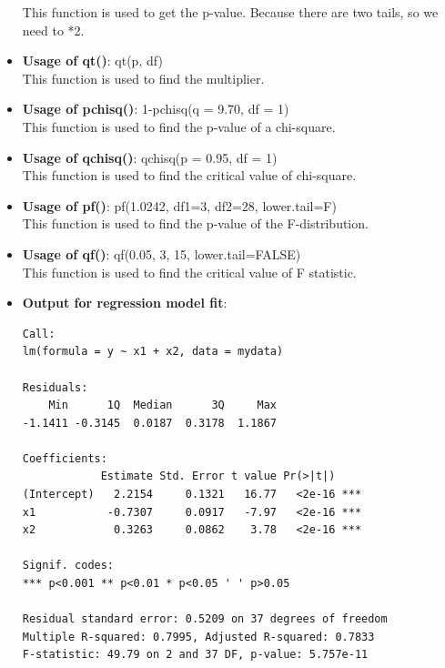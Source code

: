 \documentclass[12pt]{book}
\begin{document}
\begin{itemize}
This function is used to get the p-value. Because there are two tails, so we need to *2.

\item \textbf{Usage of qt()}: qt(p, df) \\
This function is used to find the multiplier.

\item \textbf{Usage of pchisq()}: 1-pchisq(q = 9.70, df = 1) \\
This function is used to find the p-value of a chi-square.

\item \textbf{Usage of qchisq()}: qchisq(p = 0.95, df = 1) \\
This function is used to find the critical value of chi-square.

\item \textbf{Usage of pf()}: pf(1.0242, df1=3, df2=28, lower.tail=F) \\
This function is used to find the p-value of the F-distribution.

\item \textbf{Usage of qf()}: qf(0.05, 3, 15, lower.tail=FALSE) \\
This function is used to find the critical value of F statistic.

\item \textbf{Output for regression model fit}:

\begin{mdframed}[backgroundcolor=gray!15, linecolor=black]
\begin{verbatim}
Call:
lm(formula = y ~ x1 + x2, data = mydata)

Residuals:
    Min      1Q  Median      3Q     Max 
-1.1411 -0.3145  0.0187  0.3178  1.1867 

Coefficients:
            Estimate Std. Error t value Pr(>|t|)    
(Intercept)   2.2154     0.1321   16.77   <2e-16 ***
x1           -0.7307     0.0917   -7.97   <2e-16 ***
x2            0.3263     0.0862    3.78   <2e-16 ***

Signif. codes:  
*** p<0.001 ** p<0.01 * p<0.05 ' ' p>0.05

Residual standard error: 0.5209 on 37 degrees of freedom
Multiple R-squared: 0.7995, Adjusted R-squared: 0.7833 
F-statistic: 49.79 on 2 and 37 DF, p-value: 5.757e-11
\end{verbatim}
\end{mdframed}


\end{itemize}
\end{document}
